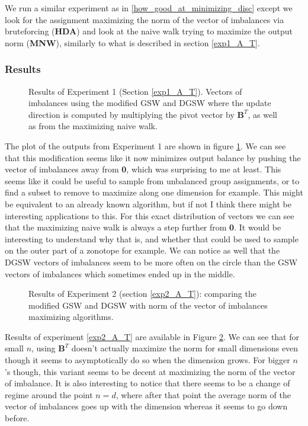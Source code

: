 \documentclass[12pt]{article}
\begin{document}
We run a similar experiment as in \ref{how_good_at_minimizing_disc} except we look for the assignment maximizing the norm of the vector of imbalances via bruteforcing (\textbf{HDA}) and look at the naive walk trying to maximize the output norm (\textbf{MNW}), similarly to what is described in section \ref{exp1_A_T}.

\subsubsection{Results}
\begin{figure}[h!]
\centering

\caption{Results of Experiment 1 (Section \ref{exp1_A_T}). Vectors of imbalances using the modified GSW and DGSW where the update direction is computed by multiplying the pivot vector by $\textbf{B}^T$, as well as from the maximizing naive walk.}
\label{A_T_instead_of_lstsq}
\end{figure}
The plot of the outputs from Experiment 1 are shown in figure \ref{A_T_instead_of_lstsq}. We can see that this modification seems like it now minimizes output balance by pushing the vector of imbalances away from \textbf{0}, which was surprising to me at least. This seems like it could be useful to sample from unbalanced group assignments, or to find a subset to remove to maximize along one dimension for example. This might be equivalent to an already known algorithm, but if not I think there might be interesting applications to this. For this exact distribution of vectors we can see that the maximizing naive walk is always a step further from \textbf{0}. It would be interesting to understand why that is, and whether that could be used to sample on the outer part of a zonotope for example. We can notice as well that the DGSW vectors of imbalances seem to be more often on the circle than the GSW vectors of imbalances which sometimes ended up in the middle.

\begin{figure}[h!]
\centering

\caption{Results of Experiment 2 (section \ref{exp2_A_T}): comparing the modified GSW and DGSW with norm of the vector of imbalances maximizing algorithms.}
\label{A_T_instead_of_lstsq_2}
\end{figure}
Results of experiment \ref{exp2_A_T} are available in Figure \ref{A_T_instead_of_lstsq_2}. We can see that for small $n$, using $\textbf{B}^T$ doesn't actually maximize the norm for small dimensions even though it seems to asymptotically do so when the dimension grows. For bigger $n$'s though, this variant seems to be decent at maximizing the norm of the vector of imbalance. It is also interesting to notice that there seems to be a change of regime around the point $n=d$, where after that point the average norm of the vector of imbalances goes up with the dimension whereas it seems to go down before.
\end{document}
